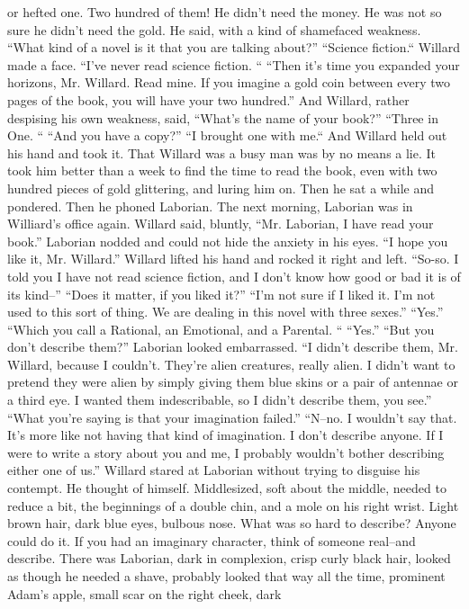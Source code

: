 \documentclass[a4paper,12pt]{article}
\begin{document}
or hefted one. Two hundred of them!
He didn’t need the money. He was not so sure he didn’t need the gold.
He said, with a kind of shamefaced weakness. “What kind of a novel is it that you are talking
about?”
“Science fiction.“
Willard made a face. “I’ve never read science fiction. “
“Then it’s time you expanded your horizons, Mr. Willard. Read mine. If you imagine a gold coin
between every two pages of the book, you will have your two hundred.”
And Willard, rather despising his own weakness, said, “What’s the name of your book?”
“Three in One. “
“And you have a copy?”
“I brought one with me.“
And Willard held out his hand and took it.
That Willard was a busy man was by no means a lie. It took him better than a week to find the
time to read the book, even with two hundred pieces of gold glittering, and luring him on.
Then he sat a while and pondered. Then he phoned Laborian.
The next morning, Laborian was in Williard’s office again.
Willard said, bluntly, “Mr. Laborian, I have read your book.”
Laborian nodded and could not hide the anxiety in his eyes. “I hope you like it, Mr. Willard.”
Willard lifted his hand and rocked it right and left. “So-so. I told you I have not read science
fiction, and I don’t know how good or bad it is of its kind--”
“Does it matter, if you liked it?”
“I’m not sure if I liked it. I’m not used to this sort of thing. We are dealing in this novel with three
sexes.”
“Yes.”
“Which you call a Rational, an Emotional, and a Parental. “
“Yes.”
“But you don’t describe them?”
Laborian looked embarrassed. “I didn’t describe them, Mr. Willard, because I couldn’t. They’re
alien creatures, really alien. I didn’t want to pretend they were alien by simply giving them blue skins or a
pair of antennae or a third eye. I wanted them indescribable, so I didn’t describe them, you see.”
“What you’re saying is that your imagination failed.”
“N--no. I wouldn’t say that. It’s more like not having that kind of imagination. I don’t describe
anyone. If I were to write a story about you and me, I probably wouldn’t bother describing either one of
us.”
Willard stared at Laborian without trying to disguise his contempt. He thought of himself. Middlesized,
soft about the middle, needed to reduce a bit, the beginnings of a double chin, and a mole on his right
wrist. Light brown hair, dark blue eyes, bulbous nose. What was so hard to describe? Anyone could do it. If
you had an imaginary character, think of someone real--and describe.
There was Laborian, dark in complexion, crisp curly black hair, looked as though he needed a
shave, probably looked that way all the time, prominent Adam’s apple, small scar on the right cheek, dark
\end{document}
